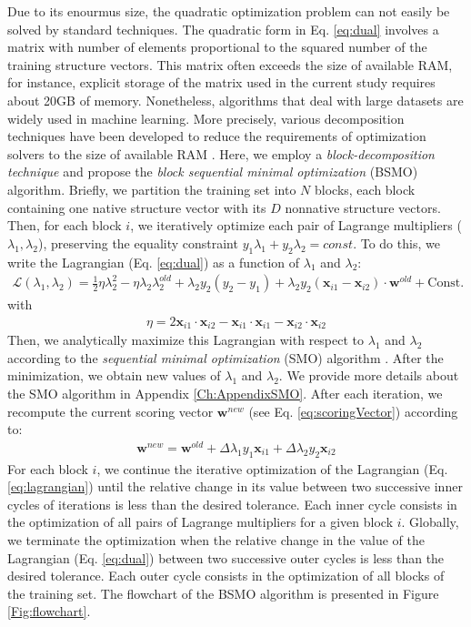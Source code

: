 Due to its enourmus size, the quadratic optimization problem can not easily be solved by standard techniques. 
The quadratic form in Eq. \ref{eq:dual} involves a matrix with number of elements proportional to the squared number of the training structure vectors. 
This matrix often exceeds the  size of available RAM, for instance, explicit storage of the matrix used in the current study requires about 20GB of memory. 
%
Nonetheless,
algorithms that deal with large datasets are widely used in machine learning.
%
More precisely, various decomposition techniques have been developed to reduce the requirements of optimization solvers to the size 
of available RAM \cite{Vapnik1979,Platt1999}. Here, we employ a {\em block-decomposition technique} 
and propose the {\em block sequential minimal optimization} (BSMO)  algorithm.
Briefly, we partition the training set into $N$ blocks, each block containing one native structure vector 
with its $D$ nonnative structure vectors. Then, for each block $i$, we iteratively optimize each pair of 
Lagrange multipliers ($\lambda_1,\lambda_2$), preserving the equality constraint  $y_1\lambda_1 + y_2\lambda_2 = const$. 
To do this, we write the Lagrangian (Eq. \ref{eq:dual}) as a function of $\lambda_1$ and $\lambda_2$:
%
\begin{eqnarray}
\mathcal{L}(\lambda_1,\lambda_2) = \frac{1}{2} \eta \lambda_2^2 
- \eta \lambda_2 \lambda_2^{old} 
+\lambda_2 y_2(y_2 - y_1)
+\lambda_2 y_2 (\mathbf{x}_{i1} 
- \mathbf{x}_{i2})\cdot\mathbf{w}^{old}
+ \mathrm{Const}.
\label{eq:lagrangian}
\end{eqnarray}
%
with
%
\begin{eqnarray}
\eta =2 \mathbf{x}_{i1} \cdot \mathbf{x}_{i2} - \mathbf{x}_{i1} \cdot \mathbf{x}_{i1} - \mathbf{x}_{i2} \cdot \mathbf{x}_{i2}
\label{eq:eta}
\end{eqnarray}
%
Then, we analytically maximize this Lagrangian with respect to $\lambda_1$ and $\lambda_2$ according to the {\em sequential minimal optimization} (SMO) algorithm \cite{Platt1999}. 
After the minimization, we obtain new values of $\lambda_1$ and $\lambda_2$. We provide more details about the SMO algorithm in Appendix \ref{Ch:AppendixSMO}.
After each iteration, we recompute the current scoring vector $\mathbf{w}^{new}$ (see Eq. \ref{eq:scoringVector}) according to:
\begin{eqnarray}
\mathbf{w}^{new} = \mathbf{w}^{old} + \Delta \lambda_1 y_1 \mathbf{x}_{i1} + \Delta \lambda_2 y_2 \mathbf{x}_{i2} 
\end{eqnarray}
For each block $i$, we continue the iterative optimization of the Lagrangian (Eq. \ref{eq:lagrangian}) until the relative change in its value between 
two successive inner cycles of iterations is less than the desired tolerance. Each inner cycle consists in the optimization of all pairs of Lagrange 
multipliers for a given block $i$. Globally, we terminate the optimization when the relative change in the value of the Lagrangian (Eq. \ref{eq:dual}) between two 
successive outer cycles is less than the desired tolerance. Each outer cycle consists in the optimization of all blocks of the training set. The flowchart of the 
BSMO algorithm is presented in Figure \ref{Fig:flowchart}.

